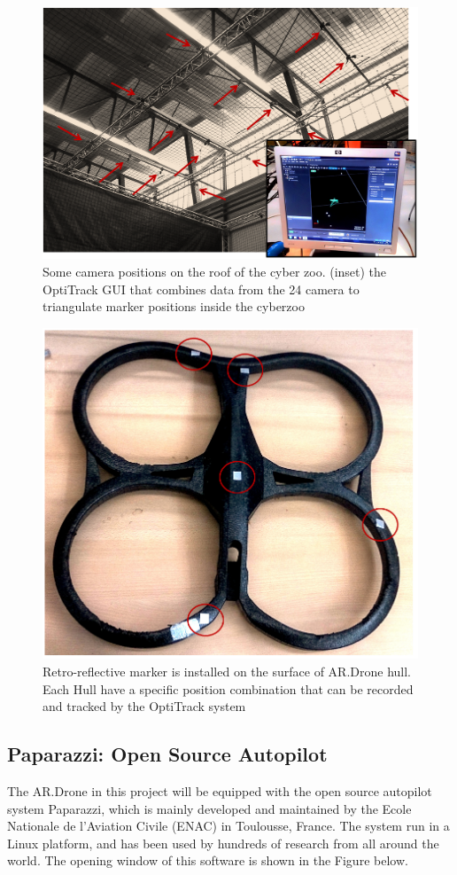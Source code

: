 \begin{figure}[h]
\includegraphics[width=0.9\linewidth]{Figures/OptiTrackCyberZoo.png}
\centering
\caption{Some camera positions on the roof of the cyber zoo. (inset) the OptiTrack GUI that combines data from the 24 camera to triangulate marker positions inside the cyberzoo}
\label{f:OptiTrackCyberZoo}
\end{figure}

\begin{figure}[h]
\includegraphics[width=0.7\linewidth]{Figures/Markers.png}
\centering
\caption{Retro-reflective marker is installed on the surface of AR.Drone hull. Each Hull have a specific position combination that can be recorded and tracked by the OptiTrack system}
\label{f:Markers}
\end{figure}

\subsection{Paparazzi: Open Source Autopilot}
The AR.Drone in this project will be equipped with the open source autopilot system Paparazzi, which is mainly developed and maintained by the Ecole Nationale de l'Aviation Civile (ENAC) in Toulousse, France. The system run in a Linux platform, and has been used by hundreds of research from all around the world\cite{Reuder:12}\cite{Royo:11}. The opening window of this software is shown in the Figure below.

